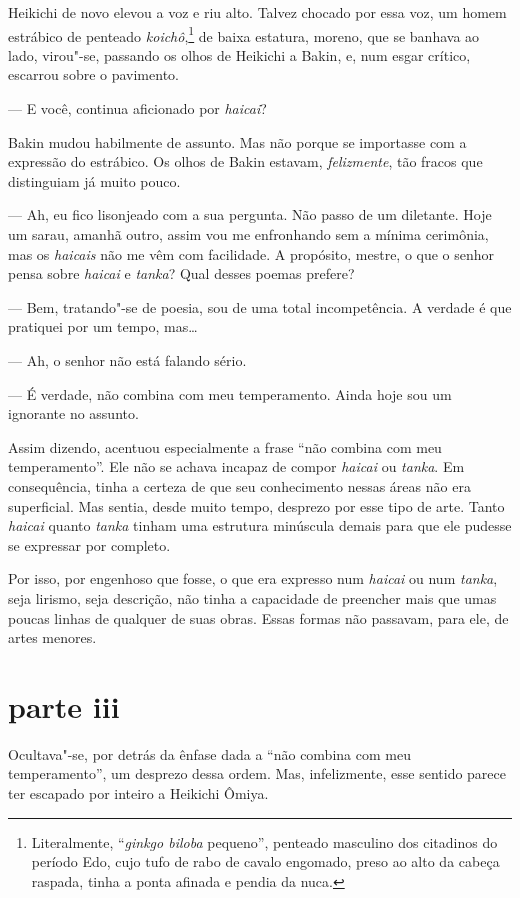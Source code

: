 Heikichi de novo elevou a voz e riu alto. Talvez chocado por essa voz,
um homem estrábico de penteado \textit{koichô},\footnote{ Literalmente, 
``\textit{ginkgo biloba} pequeno'', penteado masculino dos citadinos 
do período Edo, cujo tufo de rabo de cavalo engomado, preso ao alto da cabeça raspada, 
tinha a ponta afinada e pendia da nuca.} de baixa estatura,
moreno, que se banhava ao lado, virou"-se, passando os olhos de Heikichi
a Bakin, e, num esgar crítico, escarrou sobre o pavimento.

--- E você, continua aficionado por \emph{haicai}?

Bakin mudou habilmente de assunto. Mas não porque se importasse com a
expressão do estrábico. Os olhos de Bakin estavam,
\textit{felizmente}, tão fracos que distinguiam já muito pouco.

--- Ah, eu fico lisonjeado com a sua pergunta. Não passo de um diletante.
Hoje um sarau, amanhã outro, assim vou me enfronhando sem a mínima
cerimônia, mas os \emph{haicais} não me vêm com facilidade. 
A propósito, mestre, o que o senhor pensa
sobre \emph{haicai} e \textit{tanka}? Qual desses poemas prefere?

--- Bem, tratando"-se de poesia, sou de uma total incompetência. A verdade
é que pratiquei por um tempo, mas\ldots{}

--- Ah, o senhor não está falando sério.

--- É verdade, não combina com meu temperamento. Ainda hoje sou um
ignorante no assunto.

Assim dizendo, acentuou especialmente a frase ``não combina com meu
temperamento''. Ele não se achava incapaz de compor \emph{haicai} ou
\textit{tanka}. Em consequência, tinha a certeza de que seu
conhecimento nessas áreas não era superficial. Mas sentia, desde muito
tempo, desprezo por esse tipo de arte. Tanto \emph{haicai} quanto
\textit{tanka} tinham uma estrutura minúscula demais para que ele
pudesse se expressar por completo.

Por isso, por engenhoso que fosse, o que era expresso num \emph{haicai} ou num
\textit{tanka}, seja lirismo, seja descrição, não tinha a capacidade de
preencher mais que umas poucas linhas de qualquer de suas obras. Essas
formas não passavam, para ele, de artes menores.

\section*{parte iii}

Ocultava"-se, por detrás da ênfase dada a ``não combina com meu
temperamento'', um desprezo dessa ordem. Mas, infelizmente, esse sentido
parece ter escapado por inteiro a Heikichi Ômiya.

